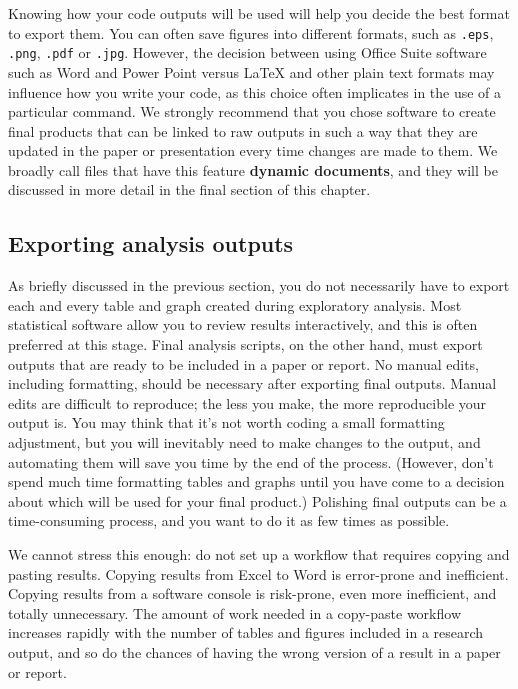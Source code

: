 
Knowing how your code outputs will be used will help you decide the best format to export them.
You can often save figures into different formats,
such as \texttt{.eps}, \texttt{.png}, \texttt{.pdf} or \texttt{.jpg}.
However, the decision between using Office Suite software such as Word and Power Point
versus {\LaTeX} and other plain text formats may influence how you write your code,
as this choice often implicates in the use of a particular command.
We strongly recommend that you chose software to create final products
that can be linked to raw outputs in such a way that they are updated
in the paper or presentation every time changes are made to them.
We broadly call files that have this feature \textbf{dynamic documents},
and they will be discussed in more detail in the final section of this chapter.


\subsection{Exporting analysis outputs}

As briefly discussed in the previous section,
you do not necessarily have to export each and every table and graph
created during exploratory analysis.
Most statistical software allow you to review results interactively,
and this is often preferred at this stage.
Final analysis scripts, on the other hand, must export outputs
that are ready to be included in a paper or report.
No manual edits, including formatting,
should be necessary after exporting final outputs.
Manual edits are difficult to reproduce;
the less you make, the more reproducible your output is.
You may think that it's not worth coding a small formatting adjustment,
but you will inevitably need to make changes to the output,
and automating them will save you time by the end of the process.
(However, don't spend much time formatting tables and graphs until
you have come to a decision about which will be used for your final product.)
Polishing final outputs can be a time-consuming process,
and you want to do it as few times as possible.

We cannot stress this enough:
do not set up a workflow that requires copying and pasting results.
Copying results from Excel to Word is error-prone and inefficient.
Copying results from a software console is risk-prone,
even more inefficient, and totally unnecessary.
The amount of work needed in a copy-paste workflow increases
rapidly with the number of tables and figures included in a research output,
and so do the chances of having the wrong version of a result in a paper or report.

